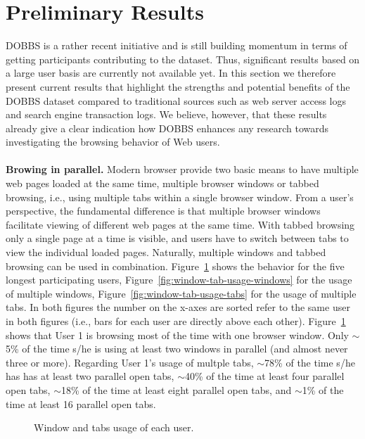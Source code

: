 \documentclass[11pt,fleqn,twoside]{article}
\begin{document}
\section{Preliminary Results}
\label{sec:evaluation}
DOBBS is a rather recent initiative and is still building momentum in terms of getting participants contributing to the dataset. Thus, significant results based on a large user basis are currently not available yet. In this section we therefore present current results that highlight the strengths and potential benefits of the DOBBS dataset compared to traditional sources such as web server access logs and search engine transaction logs. We believe, however, that these results already give a clear indication how DOBBS enhances any research towards investigating the browsing behavior of Web users.
\\
\\
\textbf{Browing in parallel.}
Modern browser provide two basic means to have multiple web pages loaded at the same time, multiple browser windows or tabbed browsing, i.e., using multiple tabs within a single browser window. From a user's perspective, the fundamental difference is that multiple browser windows facilitate viewing of different web pages at the same time. With tabbed browsing only a single page at a time is visible, and users have to switch between tabs to view the individual loaded pages. Naturally, multiple windows and tabbed browsing can be used in combination. Figure~\ref{fig:window-tab-usage} shows the behavior for the five longest participating users, Figure~\ref{fig:window-tab-usage-windows} for the usage of multiple windows, Figure~\ref{fig:window-tab-usage-tabs} for the usage of multiple tabs. In both figures the number on the x-axes are sorted refer to the same user in both figures (i.e., bars for each user are directly above each other). Figure~\ref{fig:window-tab-usage} shows that User 1 is browsing most of the 
time with one browser window. Only $\sim$5\% of the time s/he is using at least two windows in parallel (and almost never three or more). Regarding User 1's usage of multple tabs, $\sim$78\%  of the time s/he has has at least two parallel open tabs, $\sim$40\% of the time at least four parallel open tabs, $\sim$18\% of the time at least eight parallel open tabs, and $\sim$1\% of the time at least 16 parallel open tabs.
\begin{figure}[tb]
\centering
{}
\caption[]{Window and tabs usage of each user.}
\label{fig:window-tab-usage}
\end{figure}
\end{document}
